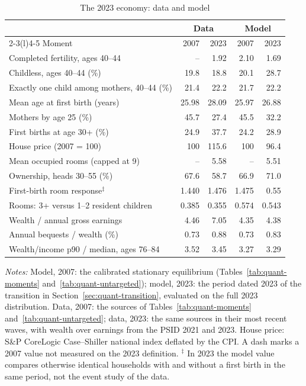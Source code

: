 \begin{table}[t]
\centering
\caption{The 2023 economy: data and model}
\label{tab:quant-2023}
\small
\begin{tabularx}{\textwidth}{@{}X rr @{\hspace{1.5em}} rr@{}}
\toprule
 & \multicolumn{2}{c}{Data} & \multicolumn{2}{c}{Model} \\
\cmidrule(lr){2-3}\cmidrule(l){4-5}
Moment & 2007 & 2023 & 2007 & 2023 \\
\midrule
Completed fertility, ages 40--44 & -- & 1.92 & 2.10 & 1.69 \\
Childless, ages 40--44 (\%) & 19.8 & 18.8 & 20.1 & 28.7 \\
Exactly one child among mothers, 40--44 (\%) & 21.4 & 22.2 & 21.7 & 22.2 \\
Mean age at first birth (years) & 25.98 & 28.09 & 25.97 & 26.88 \\
Mothers by age 25 (\%) & 45.7 & 27.4 & 45.5 & 32.2 \\
First births at age 30+ (\%) & 24.9 & 37.7 & 24.2 & 28.9 \\
\addlinespace
House price (2007 = 100) & 100 & 115.6 & 100 & 96.4 \\
Mean occupied rooms (capped at 9) & -- & 5.58 & -- & 5.51 \\
Ownership, heads 30--55 (\%) & 67.6 & 58.7 & 66.9 & 71.0 \\
First-birth room response$^{\ddagger}$ & 1.440 & 1.476 & 1.475 & 0.55 \\
Rooms: 3+ versus 1--2 resident children & 0.385 & 0.355 & 0.574 & 0.543 \\
\addlinespace
Wealth / annual gross earnings & 4.46 & 7.05 & 4.35 & 4.38 \\
Annual bequests / wealth (\%) & 0.73 & 0.88 & 0.73 & 0.83 \\
Wealth/income p90 / median, ages 76--84 & 3.52 & 3.45 & 3.27 & 3.29 \\
\bottomrule
\end{tabularx}
\par\smallskip
\begin{minipage}{0.95\linewidth}
\footnotesize\textit{Notes:} Model, 2007: the calibrated stationary
equilibrium (Tables~\ref{tab:quant-moments} and~\ref{tab:quant-untargeted});
model, 2023: the period dated 2023 of the transition in
Section~\ref{sec:quant-transition}, evaluated on the full 2023 distribution.
Data, 2007: the sources of Tables~\ref{tab:quant-moments}
and~\ref{tab:quant-untargeted}; data, 2023: the same sources in their most
recent waves, with wealth over earnings from the PSID 2021 and 2023. House
price: S\&P CoreLogic Case--Shiller national index deflated by the CPI. A
dash marks a 2007 value not measured on the 2023 definition. $^{\ddagger}$ In
2023 the model value compares otherwise identical households with and
without a first birth in the same period, not the event study of the data.
\end{minipage}
\end{table}
